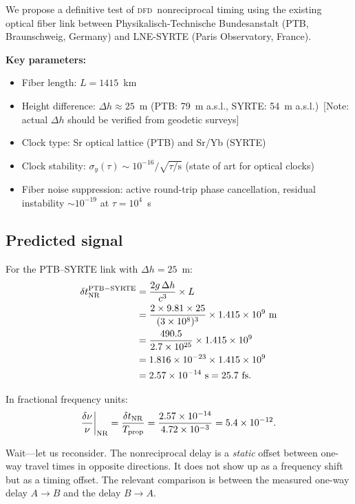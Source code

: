 \documentclass[aps,prl,twocolumn,superscriptaddress,showpacs]{revtex4-2}
\newcommand{\DFD}{\textsc{dfd}}
\begin{document}
We propose a definitive test of \DFD\ nonreciprocal timing using
the existing optical fiber link between Physikalisch-Technische
Bundesanstalt (PTB, Braunschweig, Germany) and LNE-SYRTE
(Paris Observatory, France).

\textbf{Key parameters:}
\begin{itemize}
\item Fiber length: $L = 1415$~km
\item Height difference: $\Delta h \approx 25$~m (PTB: 79~m a.s.l.,
      SYRTE: 54~m a.s.l.)\ [Note: actual $\Delta h$ should be
      verified from geodetic surveys]
\item Clock type: Sr optical lattice (PTB) and Sr/Yb (SYRTE)
\item Clock stability: $\sigma_y(\tau) \sim 10^{-16}/\sqrt{\tau/\text{s}}$
      (state of art for optical clocks)
\item Fiber noise suppression: active round-trip phase cancellation,
      residual instability $\sim 10^{-19}$ at $\tau = 10^4$~s
\end{itemize}

\subsection{Predicted signal}

For the PTB--SYRTE link with $\Delta h = 25$~m:
\begin{align}
\delta t_{\rm NR}^{\rm PTB-SYRTE} &= \frac{2g\,\Delta h}{c^3}
\times L \nonumber\\
&= \frac{2\times 9.81\times 25}{(3\times 10^8)^3}
\times 1.415\times 10^9~\text{m} \nonumber\\
&= \frac{490.5}{2.7\times 10^{25}}\times 1.415\times 10^9 \nonumber\\
&= 1.816\times 10^{-23}\times 1.415\times 10^9 \nonumber\\
&= 2.57\times 10^{-14}~\text{s} = 25.7~\text{fs}.
\label{eq:signal_PTB_SYRTE}
\end{align}

In fractional frequency units:
\begin{equation}
\frac{\delta\nu}{\nu}\bigg|_{\rm NR}
= \frac{\delta t_{\rm NR}}{T_{\rm prop}}
= \frac{2.57\times 10^{-14}}{4.72\times 10^{-3}}
= 5.4\times 10^{-12}.
\end{equation}

Wait---let us reconsider.  The nonreciprocal delay is a \emph{static}
offset between one-way travel times in opposite directions.  It
does not show up as a frequency shift but as a timing offset.  The
relevant comparison is between the measured one-way delay $A\to B$
and the delay $B\to A$.
\end{document}
